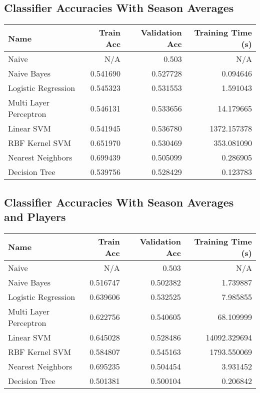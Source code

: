 \documentclass[10pt, oneside]{article}   	%
\begin{document}
\subsection*{Classifier Accuracies With Season Averages}
\begin{tabular}{lrrr}
\toprule
                   Name &  Train Acc &  Validation Acc &  Training Time (s) \\
\midrule
                  Naive &        N/A &       0.503 &                N/A \\
            Naive Bayes &   0.541690 &  0.527728 &           0.094646 \\
    Logistic Regression &   0.545323 &  0.531553 &           1.591043 \\
 Multi Layer Perceptron &   0.546131 &  0.533656 &          14.179665 \\
             Linear SVM &   0.541945 &  0.536780 &        1372.157378 \\
         RBF Kernel SVM &   0.651970 &  0.530469 &         353.081090 \\
      Nearest Neighbors &   0.699439 &  0.505099 &           0.286905 \\
          Decision Tree &   0.539756 &  0.528429 &           0.123783 \\
\bottomrule
\end{tabular}



\subsection*{Classifier Accuracies With Season Averages and Players}
\begin{tabular}{lrrr}
\toprule
                   Name &  Train Acc &  Validation Acc &  Training Time (s) \\
\midrule
                  Naive &        N/A &       0.503 &                N/A \\
            Naive Bayes &   0.516747 &  0.502382 &           1.739887 \\
    Logistic Regression &   0.639606 &  0.532525 &           7.985855 \\
 Multi Layer Perceptron &   0.622756 &  0.540605 &          68.109999 \\
             Linear SVM &   0.645028 &  0.528486 &       14092.329694 \\
         RBF Kernel SVM &   0.584807 &  0.545163 &        1793.550069 \\
      Nearest Neighbors &   0.695235 &  0.504454 &           3.931452 \\
          Decision Tree &   0.501381 &  0.500104 &           0.206842 \\
\bottomrule
\end{tabular}
\end{document}
